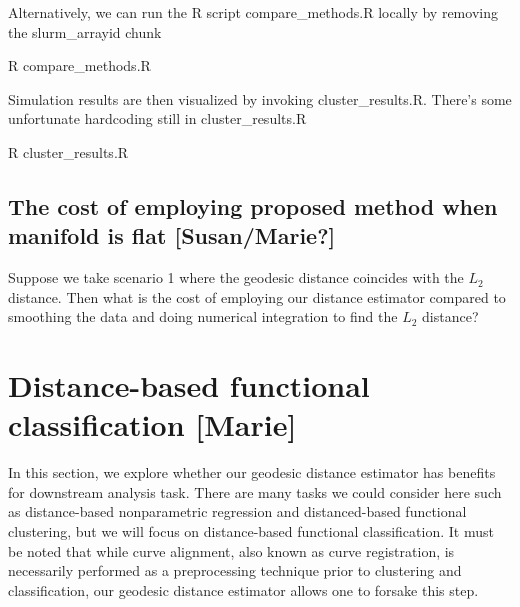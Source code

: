 \documentclass[]{article}
\newenvironment{Shaded}{\begin{snugshade}}{\end{snugshade}}
\newcommand{\NormalTok}[1]{#1}
\begin{document}
Alternatively, we can run the R script compare\_methods.R locally by
removing the slurm\_arrayid chunk

\begin{Shaded}
\begin{Highlighting}[]
\NormalTok{R compare_methods.R}
\end{Highlighting}
\end{Shaded}

Simulation results are then visualized by invoking cluster\_results.R.
There's some unfortunate hardcoding still in cluster\_results.R

\begin{Shaded}
\begin{Highlighting}[]
\NormalTok{R cluster_results.R}
\end{Highlighting}
\end{Shaded}

\hypertarget{the-cost-of-employing-proposed-method-when-manifold-is-flat-susanmarie}{%
\subsection{The cost of employing proposed method when manifold is flat
{[}Susan/Marie?{]}}\label{the-cost-of-employing-proposed-method-when-manifold-is-flat-susanmarie}}

Suppose we take scenario 1 where the geodesic distance coincides with
the \(L_2\) distance. Then what is the cost of employing our distance
estimator compared to smoothing the data and doing numerical integration
to find the \(L_2\) distance?

\hypertarget{distance-based-functional-classification-marie}{%
\section{Distance-based functional classification
{[}Marie{]}}\label{distance-based-functional-classification-marie}}

In this section, we explore whether our geodesic distance estimator has
benefits for downstream analysis task. There are many tasks we could
consider here such as distance-based nonparametric regression and
distanced-based functional clustering, but we will focus on
distance-based functional classification. It must be noted that while
curve alignment, also known as curve registration, is necessarily
performed as a preprocessing technique prior to clustering and
classification, our geodesic distance estimator allows one to forsake
this step.
\end{document}
